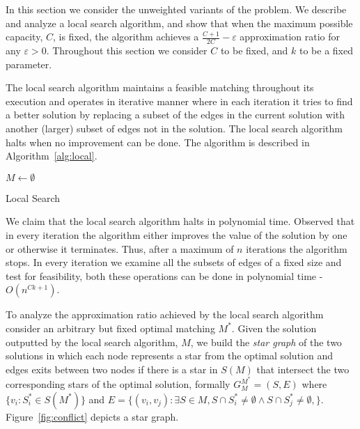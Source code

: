 In this section we consider the unweighted variants of the problem.
We describe and analyze a local search algorithm, 
and show that when the maximum possible capacity, $C$, is fixed, the algorithm achieves 
a $\frac{C + 1}{2C} - \varepsilon$ 
approximation ratio for any $\varepsilon > 0$.
Throughout this section we consider $C$ to be fixed, and $k$ to be a fixed parameter.  

The local search algorithm maintains a feasible matching throughout its execution
and operates in 
iterative manner where in each iteration it tries to find a better solution by
replacing a subset of the edges in the current solution with 
another (larger) subset of edges not in the solution.
The local search algorithm halts when no improvement can be done.
The algorithm is described in Algorithm~\ref{alg:local}. 

\begin{algorithm}
$M \leftarrow \emptyset$								\\

\caption{
\label{alg:local}
Local Search}
\end{algorithm}


We claim that the local search algorithm halts in polynomial time.
Observed that in every iteration the algorithm either improves the value of the solution
by one or otherwise it terminates. 
Thus, after a maximum of $n$ iterations the algorithm stops.
In every iteration we examine all the subsets of edges of a fixed size and test for feasibility,
both these operations can be done in polynomial time - $O(n^{Ck + 1})$. 

To analyze the approximation ratio achieved by the local search algorithm consider an 
arbitrary but fixed optimal matching $M^*$.
Given the solution outputted by the local search algorithm, 
$M$, 
we build the \emph{star graph} of the two solutions
in which each node represents a star from the optimal solution 
and edges exits between two nodes if
there is a star in $S(M)$ that intersect the two
corresponding stars of the optimal solution, 
formally $G^{M^*}_M = (S, E)$ where $\{v_i : S^*_i \in S(M^*) \}$ 
and 
$E = \{(v_i, v_j) : 
\exists S \in M,
S \cap S^*_i \neq \emptyset \land S \cap S^*_j \neq \emptyset,
\}$.
Figure~\ref{fig:conflict} depicts a star graph.

